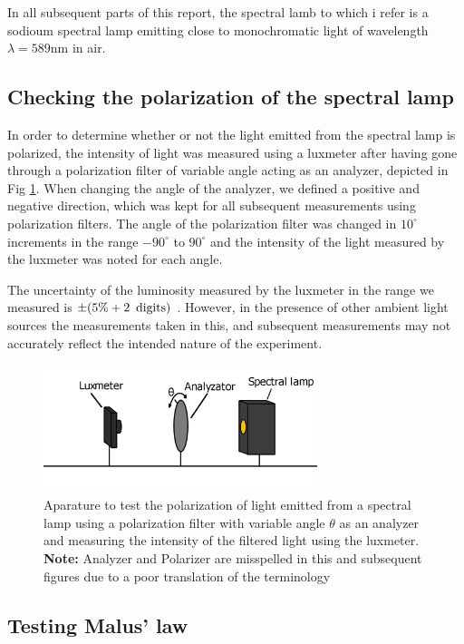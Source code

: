 \documentclass[%
 reprint,
 amsmath,amssymb,
 aps,
]{revtex4-1}
\begin{document}
  In all subsequent parts of this report, the spectral lamb to which i refer is a sodioum spectral lamp emitting close to monochromatic light of wavelength $\lambda=589$nm in air.

  \subsection{\label{subsect:polar_lamp}Checking the polarization of the spectral lamp}
    In order to determine whether or not the light emitted from the spectral lamp is polarized, the intensity of light was measured using a luxmeter\cite{data:luxmeter} after having gone through a polarization filter of variable angle acting as an analyzer, depicted in Fig \ref{fig:lux_ana_lamp}. When changing the angle of the analyzer, we defined a positive and negative direction, which was kept for all subsequent measurements using polarization filters. The angle of the polarization filter was changed in $10^\circ$ increments in the range $-90^\circ$ to $90^\circ$ and the intensity of the light measured by the luxmeter was noted for each angle.

    The uncertainty of the luminosity measured by the luxmeter in the range we measured is $\pm (5\% + 2\enspace \textup{digits})$ \cite{data:luxmeter}. However, in the presence of other ambient light sources the measurements taken in this, and subsequent measurements may not accurately reflect the intended nature of the experiment.


  \begin{figure}[h!]
    \center
    \includegraphics[width=8cm]{scripts/figs/diagram_1.png}
    \caption{Aparature to test the polarization of light emitted from a spectral lamp using a polarization filter with variable angle $\theta$ as an analyzer and measuring the intensity of the filtered light using the luxmeter. \textbf{Note:} Analyzer and Polarizer are misspelled in this and subsequent figures due to a poor translation of the terminology}
    \label{fig:lux_ana_lamp}
  \end{figure}

  \subsection{Testing Malus' law}
\end{document}
